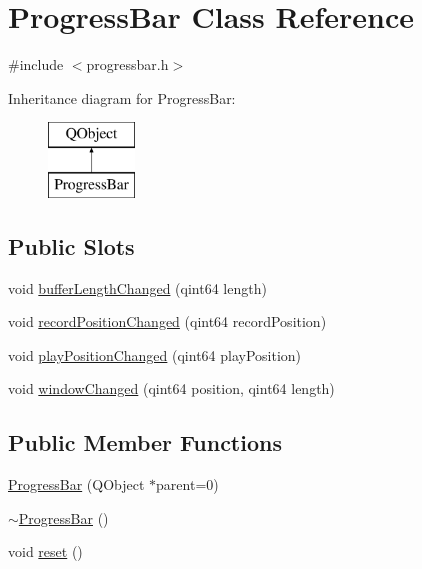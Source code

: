 \hypertarget{class_progress_bar}{}\section{Progress\+Bar Class Reference}
\label{class_progress_bar}


{\ttfamily \#include $<$progressbar.\+h$>$}

Inheritance diagram for Progress\+Bar\+:\begin{figure}[H]
\begin{center}
\leavevmode
\includegraphics[height=2.000000cm]{class_progress_bar}
\end{center}
\end{figure}
\subsection*{Public Slots}
\begin{DoxyCompactItemize}
\item 
void \hyperlink{class_progress_bar_a3b191a0ae258461a6be7a8e6408c4751}{buffer\+Length\+Changed} (qint64 length)
\item 
void \hyperlink{class_progress_bar_af3575d9c0166bf9cd5dfe46b66ba1142}{record\+Position\+Changed} (qint64 record\+Position)
\item 
void \hyperlink{class_progress_bar_af664f472f1c6832796c4e0a280a7aeed}{play\+Position\+Changed} (qint64 play\+Position)
\item 
void \hyperlink{class_progress_bar_a5df10736f27e956424de9cd77dd11956}{window\+Changed} (qint64 position, qint64 length)
\end{DoxyCompactItemize}
\subsection*{Public Member Functions}
\begin{DoxyCompactItemize}
\item 
\hyperlink{class_progress_bar_a996d2532fcf95da096907a1a272052e4}{Progress\+Bar} (Q\+Object $\ast$parent=0)
\item 
\hyperlink{class_progress_bar_aa0ced60c0ade467a4602c35443e7bc78}{$\sim$\+Progress\+Bar} ()
\item 
void \hyperlink{class_progress_bar_a9ccd597a098a693f9364741fc69a3de2}{reset} ()
\end{DoxyCompactItemize}


